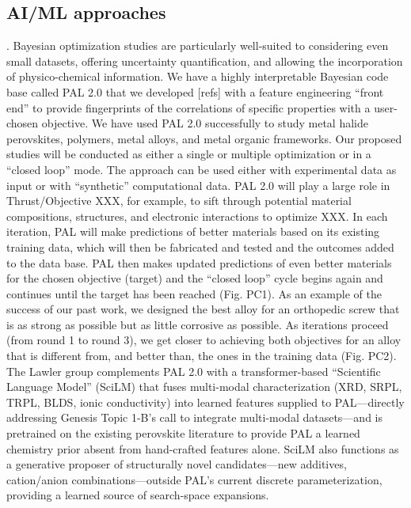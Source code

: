 \documentclass[pgs]{DOE}
\newcommand{\draft}[1]{{\color{TealBlue} #1}}
\begin{document}
\subsection{\noindent AI/ML approaches}.
Bayesian optimization studies are particularly well-suited to considering even small datasets, offering uncertainty quantification, and allowing the incorporation of physico-chemical information.
We have a highly interpretable Bayesian code base called PAL 2.0 that we developed [refs] with a feature engineering ``front end'' to provide fingerprints of the correlations of specific properties with a user-chosen objective.
We have used PAL 2.0 successfully to study metal halide perovskites, polymers, metal alloys, and metal organic frameworks. Our proposed studies will be  conducted as either a single or multiple  optimization or in a ``closed loop'' mode.
The approach can be used either with experimental data as input or with ``synthetic'' computational data. 
PAL 2.0 will play a large role in Thrust/Objective XXX, for example, to sift through potential material compositions, structures, and electronic interactions to optimize XXX. 
In each iteration, PAL will make predictions of better materials based on its existing training data, which will then be fabricated and tested and the outcomes added to the data base. 
PAL then makes updated predictions of even better materials for the chosen objective (target) and the “closed loop” cycle begins again and continues until the target has been reached (Fig. PC1). 
As an example of the success of our past work, we designed the best alloy for an orthopedic screw that is as strong as possible but as little corrosive as possible.
As iterations proceed (from round 1 to round 3), we get closer to achieving both objectives for an alloy that is different from, and better than, the ones in the training data (Fig. PC2). \\

\draft{The Lawler group complements PAL 2.0 with a transformer-based ``Scientific Language Model'' (SciLM) that fuses multi-modal characterization (XRD, SRPL, TRPL, BLDS, ionic conductivity) into learned features supplied to PAL---directly addressing Genesis Topic 1-B's call to integrate multi-modal datasets---and is pretrained on the existing perovskite literature to provide PAL a learned chemistry prior absent from hand-crafted features alone.
SciLM also functions as a generative proposer of structurally novel candidates---new additives, cation/anion combinations---outside PAL's current discrete parameterization, providing a learned source of search-space expansions.}
\end{document}
